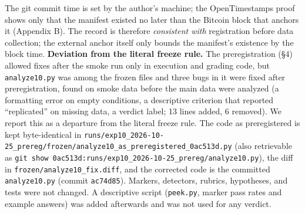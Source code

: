 \documentclass[10pt]{article}
\begin{document}
The git commit time is set by the author's machine; the OpenTimestamps proof shows only that the manifest existed no later than the Bitcoin block that anchors it (Appendix B). The record is therefore \emph{consistent with} registration before data collection; the external anchor itself only bounds the manifest's existence by the block time. \textbf{Deviation from the literal freeze rule.} The preregistration (§4) allowed fixes after the smoke run only in execution and grading code, but \texttt{analyze10.\allowbreak{}py} was among the frozen files and three bugs in it were fixed after preregistration, found on smoke data before the main data were analyzed (a formatting error on empty conditions, a descriptive criterion that reported ``replicated'' on missing data, a verdict label; 13 lines added, 6 removed). We report this as a departure from the literal freeze rule. The code as preregistered is kept byte-identical in \texttt{runs/\allowbreak{}exp10\_\allowbreak{}2026-\allowbreak{}10-\allowbreak{}25\_\allowbreak{}prereg/\allowbreak{}frozen/\allowbreak{}analyze10\_\allowbreak{}as\_\allowbreak{}preregistered\_\allowbreak{}0ac513d.\allowbreak{}py} (also retrievable as \texttt{git\ show\ 0ac513d:runs/\allowbreak{}exp10\_\allowbreak{}2026-\allowbreak{}10-\allowbreak{}25\_\allowbreak{}prereg/\allowbreak{}analyze10.\allowbreak{}py}), the diff in \texttt{frozen/\allowbreak{}analyze10\_\allowbreak{}fix.\allowbreak{}diff}, and the corrected code is the committed \texttt{analyze10.\allowbreak{}py} (commit \texttt{ac74d85}). Markers, detectors, rubrics, hypotheses, and tests were not changed. A descriptive script (\texttt{peek.\allowbreak{}py}, marker pass rates and example answers) was added afterwards and was not used for any verdict.
\end{document}

